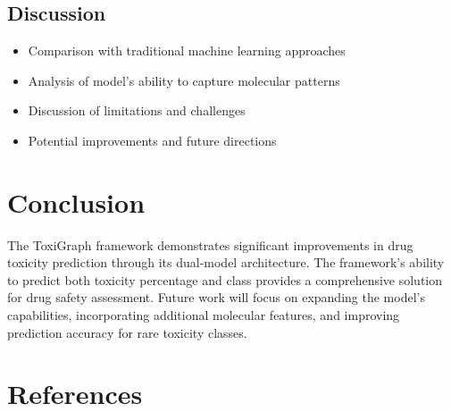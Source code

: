 \documentclass[conference]{IEEEtran}
\begin{document}
\subsection{Discussion}
\begin{itemize}
    \item Comparison with traditional machine learning approaches
    \item Analysis of model's ability to capture molecular patterns
    \item Discussion of limitations and challenges
    \item Potential improvements and future directions
\end{itemize}

\section{Conclusion}
The ToxiGraph framework demonstrates significant improvements in drug toxicity prediction through its dual-model architecture. The framework's ability to predict both toxicity percentage and class provides a comprehensive solution for drug safety assessment. Future work will focus on expanding the model's capabilities, incorporating additional molecular features, and improving prediction accuracy for rare toxicity classes.

\section*{References}
\end{document}
